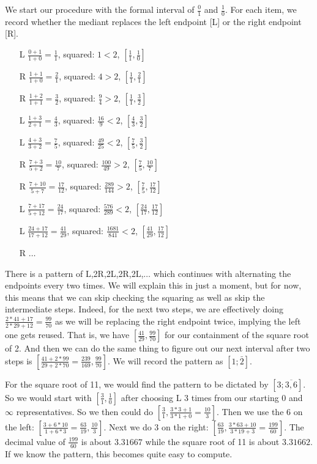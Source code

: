 \documentclass[12pt]{article}
\theoremstyle{remark}
\begin{document}
We start our procedure with the formal interval of $\tfrac{0}{1}$ and $\tfrac{1}{0}$. For each item, we record whether the mediant replaces the left endpoint [L] or the right endpoint [R].


\begin{itemize}
    \item[L] $\tfrac{0+1}{1+0} = \tfrac{1}{1}$, squared: $1 < 2$,  $[\tfrac{1}{1},\tfrac{1}{0}] $
    \item[R] $\tfrac{1+1}{1+0} = \tfrac{2}{1}$, squared: $4 > 2$, $[\tfrac{1}{1},\tfrac{2}{1}]$
    \item[R] $\tfrac{1+2}{1+1} = \tfrac{3}{2}$, squared: $\tfrac{9}{4} > 2$, $[\tfrac{1}{1},\tfrac{3}{2}]$
    \item[L] $\tfrac{1+3}{2+1} = \tfrac{4}{3}$, squared: $\tfrac{16}{9} < 2$, $[\tfrac{4}{3},\tfrac{3}{2}]$
    \item[L] $\tfrac{4+3}{3+2} = \tfrac{7}{5}$, squared: $\tfrac{49}{25} < 2$, 
    $[\tfrac{7}{5},\tfrac{3}{2}]$
    \item[R] $\tfrac{7+3}{5+2} = \tfrac{10}{7}$, squared: $\tfrac{100}{49} > 2$, 
    $[\tfrac{7}{5},\tfrac{10}{7}]$
    \item[R] $\tfrac{7+10}{5+7} = \tfrac{17}{12}$, squared: $\tfrac{289}{144} > 2$, 
    $[\tfrac{7}{5},\tfrac{17}{12}]$
    \item[L] $\tfrac{7+17}{5+12} = \tfrac{24}{17}$, squared: $\tfrac{576}{289} < 2$, 
    $[\tfrac{24}{17},\tfrac{17}{12}]$
    \item[L] $\tfrac{24+17}{17+12} = \tfrac{41}{29}$, squared: $\tfrac{1681}{841} < 2$, 
    $[\tfrac{41}{29},\tfrac{17}{12}]$
    \item[R] $\ldots$
\end{itemize}

There is a pattern of L,2R,2L,2R,2L,$\ldots$ which continues with alternating the endpoints every two times. We will explain this in just a moment, but for now, this means that we can skip checking the squaring as well as skip the intermediate steps. Indeed, for the next two steps, we are effectively doing $\tfrac{2*41 + 17}{2*29 + 12} = \tfrac{99}{70}$ as we will be replacing the right endpoint twice, implying the left one gets reused. That is, we have $[\tfrac{41}{29}, \tfrac{99}{70}]$ for our containment of the square root of 2. And then we can do the same thing to figure out our next interval after two steps is $[\tfrac{41+2*99}{29+2*70}=\tfrac{239}{169}, \tfrac{99}{70}]$. We will record the pattern as $[1; \bar{2}]$.

For the square root of 11, we would find the pattern to be dictated by $[3;\overline{3,6}]$. So we would start with $[\tfrac{3}{1}, \tfrac{1}{0}]$ after choosing L 3 times from our starting 0 and $\infty$ representatives. So we then could do $[\tfrac{3}{1}, \tfrac{3*3 + 1}{3*1 + 0} = \tfrac{10}{3}]$. Then we use the 6 on the left:  $[\tfrac{3+6*10}{1+6*3} = \tfrac{63}{19}, \tfrac{10}{3}]$. Next we do 3 on the right:  $[\tfrac{63}{19}, \tfrac{3*63+10}{3*19+3} = \tfrac{199}{60}]$. The decimal value of $\tfrac{199}{60}$ is about $3.31667$ while the square root of 11 is about $3.31662$. If we know the pattern, this becomes quite easy to compute. 
\end{document}
